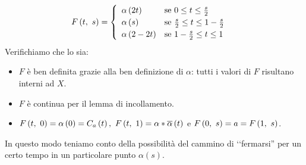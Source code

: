 \begin{demonstration}
\begin{enumerate}[label=\Roman*]
\begin{equation}
	F\left(t,\ s\right)=\begin{cases}
		\begin{array}{ll}
			\alpha\left(2t\right)&\text{se }0\leq t\leq \frac{s}{2}\\
			\alpha\left(s\right)&\text{se }\frac{s}{2}\leq t\leq 1-\frac{s}{2}\\
			\alpha\left(2-2t\right)&\text{se }1-\frac{s}{2}\leq t\leq 1
		\end{array}
	\end{cases}
\end{equation}
Verifichiamo che lo sia:
\begin{itemize}
\item $F$ è ben definita grazie alla ben definizione di $\alpha$: tutti i valori di $F$ risultano interni ad $X$.
\item $F$ è continua per il lemma di incollamento.
\item $\mvf{F}{t}{0}=\alpha\left(0\right)=C_a\left(t\right),\ \mvf{F}{t}{1}=\alpha\ast\overline{\alpha}\left(t\right)$ e $F\left(0,\ s\right)=a=F\left(1,\ s\right)$.
\end{itemize}
In questo modo teniamo conto della possibilità del cammino di ‘‘fermarsi'' per un certo tempo in un particolare punto $\alpha\left(s\right)$. 
\end{enumerate}
\end{demonstration}
